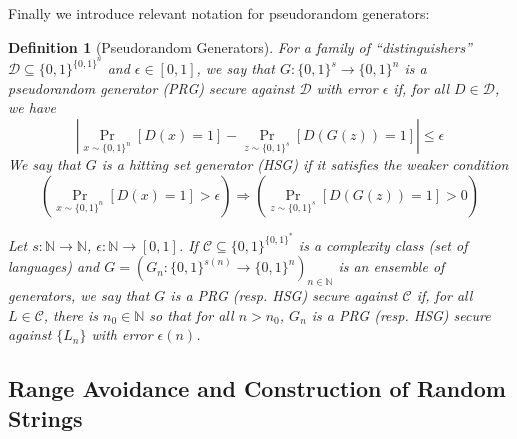 \documentclass[11pt]{article}
\newtheorem{definition}{Definition}
\newcommand{\B}{\{0,1\}}
\begin{document}
Finally we introduce relevant notation for pseudorandom generators:

\begin{definition}[Pseudorandom Generators]
For a family of ``distinguishers'' $\mathcal{D} \subseteq \B^{\B^n}$ and $\epsilon \in [0,1]$, we say that $G: \B^s \to \B^n$ is a pseudorandom generator (PRG) secure against $\mathcal{D}$ with error $\epsilon$ if, for all $D \in \mathcal{D}$, we have
\[
|\Pr_{x \sim \B^n}[D(x)=1] - \Pr_{z \sim \B^s}[D(G(z)) = 1]| \leq \epsilon
\]
We say that $G$ is a hitting set generator (HSG) if it satisfies the weaker condition
\[
(\Pr_{x \sim \B^n}[D(x)=1] > \epsilon) \Rightarrow  (\Pr_{z \sim \B^s}[D(G(z)) = 1]>0)
\]

Let $s: \mathbb{N} \to \mathbb{N}$, $\epsilon: \mathbb{N} \to [0,1]$. If $\mathcal{C} \subseteq \B^{\B^*}$ is a complexity class (set of languages) and $G = (G_n: \B^{s(n)} \to \B^{n})_{n \in \mathbb{N}}$ is an ensemble of generators, we say that $G$ is a PRG (resp. HSG) secure against $\mathcal{C}$ if, for all $L \in \mathcal{C}$, there is $n_0 \in \mathbb{N}$ so that for all $n > n_0$, $G_n$ is a PRG (resp. HSG) secure against $\{L_n\}$ with error $\epsilon(n)$.
\end{definition}


\subsection{Range Avoidance and Construction of Random Strings}
\end{document}
